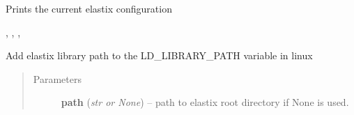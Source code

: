\documentclass[letterpaper,10pt,english]{sphinxmanual}
\begin{document}

\begin{fulllineitems}
\label{api/ClearMap.Alignment:ClearMap.Alignment.Elastix.printSettings}
Prints the current elastix configuration




{\hyperref[api/ClearMap.Alignment:ClearMap.Alignment.Elastix.ElastixBinary]{\emph{}}}, {\hyperref[api/ClearMap.Alignment:ClearMap.Alignment.Elastix.ElastixLib]{\emph{}}}, {\hyperref[api/ClearMap.Alignment:ClearMap.Alignment.Elastix.TransformixBinary]{\emph{}}}, {\hyperref[api/ClearMap.Alignment:ClearMap.Alignment.Elastix.Initialized]{\emph{}}}



\end{fulllineitems}


\begin{fulllineitems}
\label{api/ClearMap.Alignment:ClearMap.Alignment.Elastix.setElastixLibraryPath}
Add elastix library path to the LD\_LIBRARY\_PATH variable in linux
\begin{quote}\begin{description}
\item[{Parameters}] \leavevmode
\textbf{path} (\emph{str or None}) --
path to elastix root directory if None {\hyperref[api/ClearMap.Settings:ClearMap.Settings.ElastixPath]{\emph{}}} is used.

\end{description}\end{quote}

\end{fulllineitems}

\end{document}

